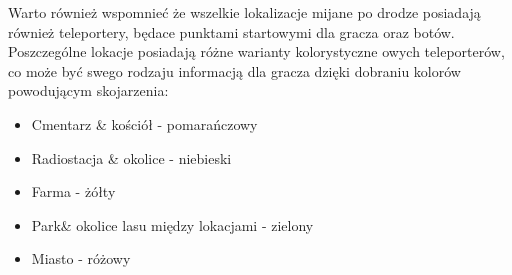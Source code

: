 Warto również wspomnieć że wszelkie lokalizacje mijane po drodze posiadają również teleportery, będace punktami startowymi dla gracza oraz botów. Poszczególne lokacje posiadają różne warianty kolorystyczne owych teleporterów, co może być swego rodzaju informacją dla gracza dzięki dobraniu kolorów powodującym skojarzenia:
\begin{itemize}
    \item Cmentarz \& kościół - pomarańczowy
    \item Radiostacja \& okolice - niebieski
    \item Farma - żółty
    \item Park\& okolice lasu między lokacjami - zielony
    \item Miasto - różowy
\end{itemize}